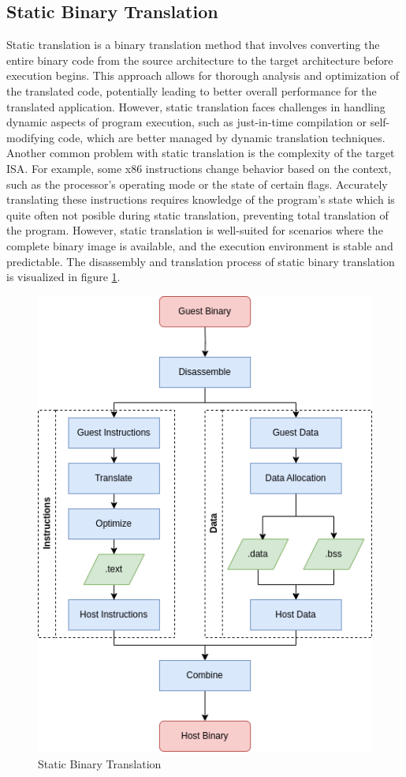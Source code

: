 \subsection{Static Binary Translation}
Static translation is a binary translation method that involves converting the entire binary code from the source architecture to the target architecture before execution begins.
This approach allows for thorough analysis and optimization of the translated code, potentially leading to better overall performance for the translated application.
However, static translation faces challenges in handling dynamic aspects of program execution, such as just-in-time compilation or self-modifying code, which are better managed by dynamic translation techniques.
Another common problem with static translation is the complexity of the target \ac{ISA}.
For example, some x86 instructions change behavior based on the context, such as the processor's operating mode or the state of certain flags.
Accurately translating these instructions requires knowledge of the program's state which is quite often not posible during static translation, preventing total translation of the program.
However, static translation is well-suited for scenarios where the complete binary image is available, and the execution environment is stable and predictable.
The disassembly and translation process of static binary translation is visualized in figure \ref{fig:static_binary_translation}.

\begin{figure}[ht]
    \centering
    \includegraphics[width=0.6\linewidth]{figures/sta_bin_trans}
    \caption{Static Binary Translation}
    \label{fig:static_binary_translation}
\end{figure}

